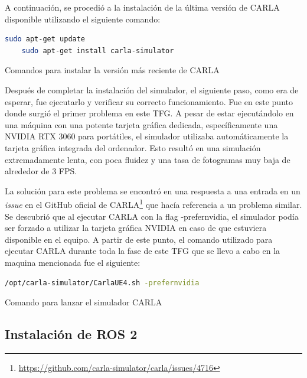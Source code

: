 A continuación, se procedió a la instalación de la última versión de CARLA disponible utilizando el siguiente comando:


   \begin{code}[H]
	\begin{lstlisting}[language=sh]
    sudo apt-get update
    sudo apt-get install carla-simulator
	\end{lstlisting}
\caption[Comandos para instalar la versión más reciente de CARLA]{Comandos para instalar la versión más reciente de CARLA}
\label{cod:Comandos para instalar CARLA}
\end{code}


Después de completar la instalación del simulador, el siguiente paso, como era de esperar, fue ejecutarlo y verificar su correcto funcionamiento. Fue en este punto donde surgió el primer problema en este \ac{TFG}. A pesar de estar ejecutándolo en una máquina con una potente tarjeta gráfica dedicada, específicamente una NVIDIA RTX 3060 para portátiles, el simulador utilizaba automáticamente la tarjeta gráfica integrada del ordenador. Esto resultó en una simulación extremadamente lenta, con poca fluidez y una tasa de fotogramas muy baja de alrededor de 3 \ac{FPS}.

\bigskip

La solución para este problema se encontró en una respuesta a una entrada en un \textit{issue} en el GitHub oficial de CARLA\footnote{\url{https://github.com/carla-simulator/carla/issues/4716}} que hacía referencia a un problema similar. Se descubrió que al ejecutar CARLA con la flag -prefernvidia, el simulador podía ser forzado a utilizar la tarjeta gráfica NVIDIA en caso de que estuviera disponible en el equipo. A partir de este punto, el comando utilizado para ejecutar CARLA durante toda la fase de este \ac{TFG} que se llevo a cabo en la maquina mencionada fue el siguiente:

   \begin{code}[H]
	\begin{lstlisting}[language=sh]
		/opt/carla-simulator/CarlaUE4.sh -prefernvidia
	\end{lstlisting}
\caption[Comando para lanzar el simulador CARLA]{Comando para lanzar el simulador CARLA}
\label{cod:Comando para lanzar el simulador CARLA}
\end{code}
 

\subsection{Instalación de ROS 2}
\label{Instalación de ROS 2}

